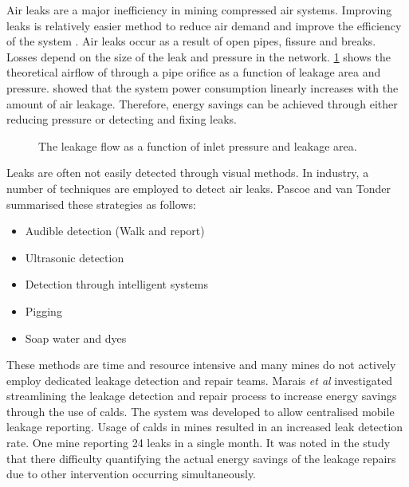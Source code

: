 		 Air leaks are a major inefficiency in mining compressed air systems. Improving leaks is relatively easier method to  reduce air demand and improve the efficiency of the system  \cite{van2011sustaining}. Air leaks occur as a result of open pipes, fissure and breaks. Losses depend on the size of the leak and pressure in the network. \cref{fig: Leak losses} shows the theoretical airflow of through a pipe orifice as a function of leakage area and pressure\footnotemark[1]. \cite{van2011sustaining} showed that the system power consumption linearly increases with the amount of air leakage. Therefore, energy savings can be achieved through either reducing pressure or detecting and fixing leaks.
		 \begin{figure}[h]
		 	\centering
		 	\fbox{\hspace{2cm}\hspace{2cm}}
		 	\caption[The leakage flow as a function of inlet pressure and leakage area]{ The leakage flow as a function of inlet pressure and leakage area\protect\footnotemark[1].}
		 	\label{fig: Leak losses}
		 \end{figure}
	 \par 
		 Leaks are often not easily detected through visual methods. In industry, a number of techniques are employed to detect air leaks. Pascoe \cite{Pascoe2016Masters} and van Tonder \cite{vanTonder2010Masters} summarised these strategies as follows:
		 \begin{itemize}
		 	\item Audible detection (Walk and report)
		 	\item Ultrasonic detection
		 	\item Detection through intelligent systems
		 	\item Pigging
		 	\item Soap water and dyes
		 \end{itemize}
	 	 These methods are time and resource intensive and many mines do not actively employ dedicated leakage detection and repair teams. Marais \textit{et al} \cite{marais2009increased} investigated streamlining the leakage detection and repair process to increase energy savings through the use of \gls{calds}. The system was developed to allow centralised mobile leakage reporting. Usage of \gls{calds} in mines resulted in an increased leak detection rate. One mine reporting 24 leaks in a single month. It was noted in the study that there difficulty quantifying the actual energy savings of the leakage repairs due to other intervention occurring simultaneously.	
		 
